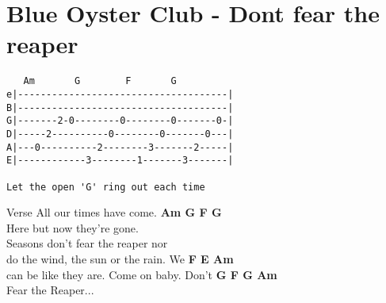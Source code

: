 \section{Blue Oyster Club - Dont fear the reaper}
\begin{verbatim}
   Am       G        F       G
e|-------------------------------------|
B|-------------------------------------|
G|-------2-0--------0--------0-------0-|
D|-----2----------0--------0-------0---|
A|---0----------2--------3-------2-----|
E|------------3--------1-------3-------|

Let the open 'G' ring out each time
\end{verbatim}

Verse
All    our times have come. \textbf{Am G F G}\\
Here   but now   they're  gone.\\
Seasons don't fear the reaper   nor\\
do the wind,  the sun or the rain.     We \textbf{F E Am}\\
can be like they are.   Come on baby.  Don't \textbf{G F G Am}\\

Fear the Reaper...
\newpage


\newpage


